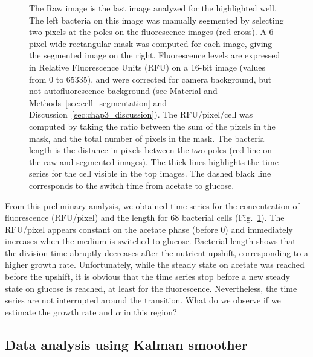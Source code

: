 \begin{figure}[p]
{The Raw image is the last image analyzed for the highlighted well.
The left bacteria on this image was manually segmented by selecting two pixels at the poles on the fluorescence images (red cross).
A 6-pixel-wide rectangular mask was computed for each image, giving the segmented image on the right.
Fluorescence levels are expressed in Relative Fluorescence Units (RFU) on a 16-bit image (values from 0 to 65335), and were corrected for camera background, but not autofluorescence background (see Material and Methods~\ref{sec:cell_segmentation} and Discussion~\ref{sec:chap3_discussion}).
The RFU/pixel/cell was computed by taking the ratio between the sum of the pixels in the mask, and the total number of pixels in the mask.
The bacteria length is the distance in pixels between the two poles (red line on the raw and segmented images).
The thick lines highlights the time series for the cell visible in the top images.
The dashed black line corresponds to the switch time from acetate to glucose.
}
\label{fig:data_acquisition}
\end{figure}

From this preliminary analysis, we obtained time series for the concentration of fluorescence (RFU/pixel) and the length for 68 bacterial cells (Fig.~\ref{fig:data_acquisition}).
The RFU/pixel appears constant on the acetate phase (before 0) and immediately increases when the medium is switched to glucose.
Bacterial length shows that the division time abruptly decreases after the nutrient upshift, corresponding to a higher growth rate.
Unfortunately, while the steady state on acetate was reached before the upshift, it is obvious that the time series stop before a new steady state on glucose is reached, at least for the fluorescence.
Nevertheless, the time series are not interrupted around the transition.
What do we observe if we estimate the growth rate and $\alpha$ in this region?

\subsection{Data analysis using Kalman smoother}
\label{sec:res_kalman}

